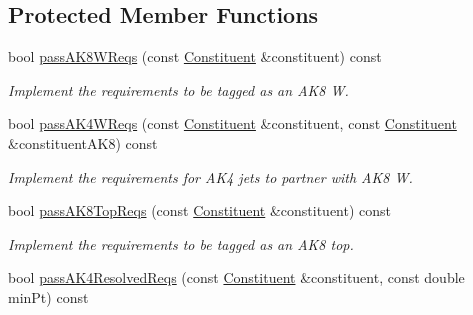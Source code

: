 \subsection*{Protected Member Functions}
\begin{DoxyCompactItemize}
\item 
\hypertarget{classTTMConstituentReqs_a24ed62136b9c36fa4a987a12e43d8abe}{bool \hyperlink{classTTMConstituentReqs_a24ed62136b9c36fa4a987a12e43d8abe}{pass\-A\-K8\-W\-Reqs} (const \hyperlink{classConstituent}{Constituent} \&constituent) const }\label{classTTMConstituentReqs_a24ed62136b9c36fa4a987a12e43d8abe}

\begin{DoxyCompactList}\small\item\em Implement the requirements to be tagged as an A\-K8 W. \end{DoxyCompactList}\item 
\hypertarget{classTTMConstituentReqs_ad2ff0cdbd2576c566ccf86be56c17626}{bool \hyperlink{classTTMConstituentReqs_ad2ff0cdbd2576c566ccf86be56c17626}{pass\-A\-K4\-W\-Reqs} (const \hyperlink{classConstituent}{Constituent} \&constituent, const \hyperlink{classConstituent}{Constituent} \&constituent\-A\-K8) const }\label{classTTMConstituentReqs_ad2ff0cdbd2576c566ccf86be56c17626}

\begin{DoxyCompactList}\small\item\em Implement the requirements for A\-K4 jets to partner with A\-K8 W. \end{DoxyCompactList}\item 
\hypertarget{classTTMConstituentReqs_af02e6acd3232253af0baf72a6c69a8a5}{bool \hyperlink{classTTMConstituentReqs_af02e6acd3232253af0baf72a6c69a8a5}{pass\-A\-K8\-Top\-Reqs} (const \hyperlink{classConstituent}{Constituent} \&constituent) const }\label{classTTMConstituentReqs_af02e6acd3232253af0baf72a6c69a8a5}

\begin{DoxyCompactList}\small\item\em Implement the requirements to be tagged as an A\-K8 top. \end{DoxyCompactList}\item 
\hypertarget{classTTMConstituentReqs_a146535ca0b3c55a3178dff46d8312371}{bool \hyperlink{classTTMConstituentReqs_a146535ca0b3c55a3178dff46d8312371}{pass\-A\-K4\-Resolved\-Reqs} (const \hyperlink{classConstituent}{Constituent} \&constituent, const double min\-Pt) const }\label{classTTMConstituentReqs_a146535ca0b3c55a3178dff46d8312371}


\end{DoxyCompactItemize}
